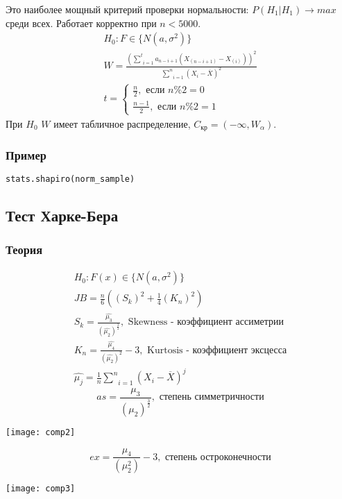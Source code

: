 Это наиболее мощный критерий проверки нормальности: $P(H_1|H_1) \to max$ среди всех. Работает корректно при $n < 5000$.
$$\begin{gathered}
	H_0: F \in \{N(a, \sigma^2)\}\\
	W = \frac{\left( \underset{i=1}{\overset{t}{\sum}}a_{n-i+1} (X_{(n-i+1)} - X_{(i)}) \right)^2}{\underset{i=1}{\overset{n}{\sum}}(X_i - \overline{X})^2}\\
	t = \begin{cases}
		\frac{n}{2}, \text{ если } n\% 2 =0 \\
		\frac{n-1}{2}, \text{ если } n\% 2 =1
	\end{cases}
\end{gathered}$$
При $H_0$ $W$ имеет табличное распределение, $C_{\text{кр}} = (-\infty, W_{\alpha})$.

\subsubsection*{Пример}\label{cha:compl/sec:nenorm/subsec:shapiro/subsubsection:prob}

\begin{lstlisting}[language=Python]
	stats.shapiro(norm_sample)
\end{lstlisting}

\subsection{Тест Харке-Бера}\label{cha:compl/sec:norm/subsec:ber}

\subsubsection*{Теория}\label{cha:compl/sec:norm/subsec:ber/subsubsection:theory}

$$\begin{gathered}
	H_0: F(x) \in \{N(a, \sigma^2)\} \\
	JB = \frac{n}{6} \left( (S_k)^2 + \frac{1}{4} (K_n)^2 \right) \\
	S_k = \frac{\hat{\mu_3}}{(\hat{\mu_2})^{\frac{3}{2}}}, \text{ Skewness - коэффициент ассиметрии} \\
	K_n = \frac{\hat{\mu_4}}{(\hat{\mu_2})^2}-3, \text{ Kurtosis - коэффициент эксцесса}\\
	\hat{\mu_j} = \frac{1}{n}\underset{i=1}{\overset{n}{\sum}}(X_i - \overline{X})^j
\end{gathered}$$
$$as = \frac{\mu_3}{(\mu_2)^{\frac{3}{2}}}, \text{ степень симметричности}$$
\begin{center}
	\texttt{[image: comp2]}
\end{center}
$$ex = \frac{\mu_4}{(\mu_2^2)}-3, \text{ степень остроконечности}$$
\begin{center}
	\texttt{[image: comp3]}
\end{center}

